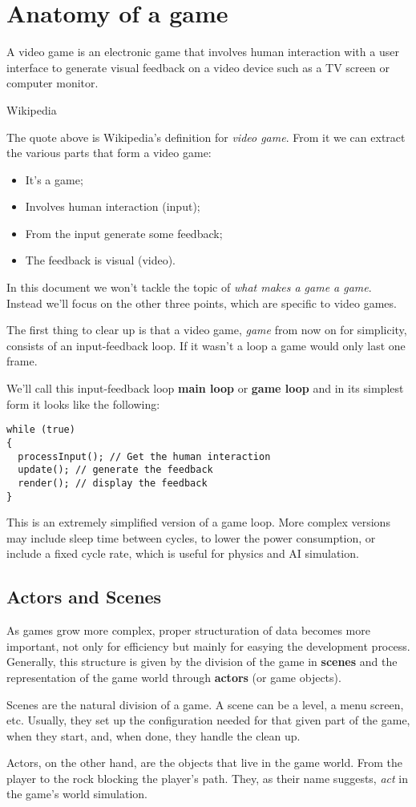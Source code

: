 \chapter{Anatomy of a game}\label{ch:anatomy_of_a_game}

\epigraph{A video game is an electronic game that involves human interaction with 
a user interface to generate visual feedback on a video device such as a TV screen 
or computer monitor.}{Wikipedia}

The quote above is Wikipedia's definition for \textit{video game}. From it we 
can extract the various parts that form a video game:

\begin{itemize}
\item It's a game;
\item Involves human interaction (input);
\item From the input generate some feedback;
\item The feedback is visual (video).
\end{itemize}

In this document we won't tackle the topic of \textit{what makes a game a game}. Instead 
we'll focus on the other three points, which are specific to video games.

The first thing to clear up is that a video game, \textit{game} from now on for simplicity, 
consists of an input-feedback loop. If it wasn't a loop a game would only last one 
frame.

We'll call this input-feedback loop \textbf{main loop} or \textbf{game loop} and 
in its simplest form it looks like the following:

\pagebreak
\begin{lstlisting}[caption=Basic main loop.]
while (true)
{
  processInput(); // Get the human interaction
  update(); // generate the feedback
  render(); // display the feedback
}
\end{lstlisting}

This is an extremely simplified version of a game loop. More complex versions may 
include sleep time between cycles, to lower the power consumption, or include a fixed 
cycle rate, which is useful for physics and AI simulation.

\section{Actors and Scenes}

As games grow more complex, proper structuration of data becomes more important, not 
only for efficiency but mainly for easying the development process. Generally, this 
structure is given by the division of the game in \textbf{scenes} and the representation 
of the game world through \textbf{actors} (or game objects).

Scenes are the natural division of a game. A scene can be a level, a menu screen, 
etc. Usually, they set up the configuration needed for that given part of the game, 
when they start, and, when done, they handle the clean up.

Actors, on the other hand, are the objects that live in the game world. From the player 
to the rock blocking the player's path. They, as their name suggests, \textit{act} 
in the game's world simulation.
